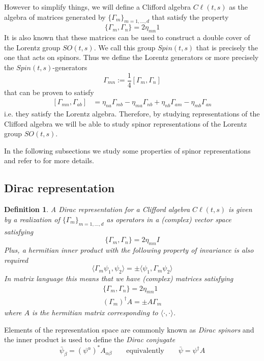\documentclass[a4paper,12pt]{article}
\newtheorem{df}{Definition}
\numberwithin{equation}{section}
\numberwithin{thm}{section}
\numberwithin{exm}{section}
\newcommand{\<}{{\langle}}
\renewcommand{\>}{{\rangle}}
\renewcommand{\a}{{\alpha}}
\renewcommand{\b}{{\beta}}
\newcommand{\G}{{\Gamma}}
\newcommand{\m}{{\mu}}
\newcommand{\n}{{\nu}}
\renewcommand{\r}{{\rho}}
\begin{document}
However to simplify things, we will define a Clifford algebra $C\ell(t,s)$ as the algebra of matrices generated by $\{\G_m\}_{m=1,\ldots,d}$ that satisfy the property
	\begin{equation}
	\{\G_m, \G_n\} = 2\eta_{mn} 1
	\end{equation}
It is also known that these matrices can be used to construct a double cover of the Lorentz group $SO(t,s)$. We call this group $Spin(t,s)$ that is precisely the one that acts on spinors. Thus we define the Lorentz generators or more precisely the $Spin(t,s)$-generators
	\begin{equation}
	\G_{mn} := \frac14 [\G_m, \G_n]
	\end{equation}
that can be proven to satisfy
	\begin{align}
	[\G_{mn}, \G_{a b}] & = \eta_{n a} \G_{m b} - \eta_{m a} \G_{n b} + \eta_{n b} \G_{a m} - \eta_{m b} \G_{a n}
	\end{align}
i.e. they satisfy the Lorentz algebra. Therefore, by studying representations of the Clifford algebra we will be able to study spinor representations of the Lorentz group $SO(t,s)$.

In the following subsections we study some properties of spinor representations and refer to \cite{Kugo1983} for more details.


\subsection{Dirac representation}
	\begin{df}
	A Dirac representation for a Clifford algebra $C\ell(t,s)$ is given by a realization of $\{\G_m\}_{m=1,\ldots,d}$ as operators in a (complex) vector space satisfying
		\begin{equation}
		\{\G_m, \G_n\} = 2\eta_{mn} I
		\end{equation}
	Plus, a hermitian inner product with the following property of invariance is also required
		\begin{equation}
		\langle \G_m \psi_1, \psi_2 \rangle = \pm \langle \psi_1, \G_m \psi_2 \rangle
		\end{equation}
	In matrix language this means that we have (complex) matrices satisfying
		\begin{align}
		\{\G_m, \G_n\} = 2\eta_{mn} 1 \\
		(\G_m)^\dagger A = \pm A \G_m \label{hermiticity}
		\end{align}
	where $A$ is the hermitian matrix corresponding to $\langle\cdot,\cdot\rangle$.
	\end{df}
Elements of the representation space are commonly known as {\it Dirac spinors} and the inner product is used to define the {\it Dirac conjugate}
	\begin{equation}
	\bar\psi_\b = (\psi^\a)^* A_{\a\b}\qquad\text{equivalently}\qquad \bar\psi = \psi^\dagger A
	\end{equation}
\end{document}

